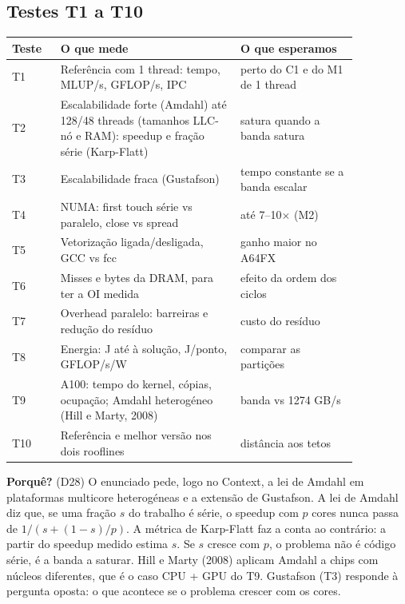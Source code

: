 \documentclass[11pt,a4paper]{article}
\newcommand{\porque}[1]{\par\noindent\colorbox{blue!6}{\parbox{\dimexpr\linewidth-2\fboxsep}{\small\textbf{Porquê?} #1}}\par}
\begin{document}
\subsection{Testes T1 a T10}
\begin{table}[H]\centering\small
\begin{tabular}{@{}l>{\raggedright}p{0.52\linewidth}>{\raggedright\arraybackslash}p{0.34\linewidth}@{}}\toprule
\textbf{Teste} & \textbf{O que mede} & \textbf{O que esperamos} \\ \midrule
T1 & Referência com 1 thread: tempo, MLUP/s, GFLOP/s, IPC & perto do C1 e do M1 de 1 thread \\
T2 & Escalabilidade forte (Amdahl) até 128/48 threads (tamanhos LLC-nó e RAM): speedup e fração série (Karp-Flatt) & satura quando a banda satura \\
T3 & Escalabilidade fraca (Gustafson) & tempo constante se a banda escalar \\
T4 & NUMA: first touch série vs paralelo, close vs spread & até 7--10$\times$ (M2) \\
T5 & Vetorização ligada/desligada, GCC vs fcc & ganho maior no A64FX \\
T6 & Misses e bytes da DRAM, para ter a OI medida & efeito da ordem dos ciclos \\
T7 & Overhead paralelo: barreiras e redução do resíduo & custo do resíduo \\
T8 & Energia: J até à solução, J/ponto, GFLOP/s/W & comparar as partições \\
T9 & A100: tempo do kernel, cópias, ocupação; Amdahl heterogéneo (Hill e Marty, 2008) & banda vs 1274 GB/s \\
T10 & Referência e melhor versão nos dois rooflines & distância aos tetos \\ \bottomrule
\end{tabular}
\end{table}

\porque{(D28) O enunciado pede, logo no Context, a lei de Amdahl em plataformas multicore heterogéneas
e a extensão de Gustafson. A lei de Amdahl diz que, se uma fração $s$ do trabalho é série, o speedup com
$p$ cores nunca passa de $1/(s+(1-s)/p)$. A métrica de Karp-Flatt faz a conta ao contrário: a partir do
speedup medido estima $s$. Se $s$ cresce com $p$, o problema não é código série, é a banda a saturar.
Hill e Marty (2008) aplicam Amdahl a chips com núcleos diferentes, que é o caso CPU + GPU do T9.
Gustafson (T3) responde à pergunta oposta: o que acontece se o problema crescer com os cores.}
\end{document}
